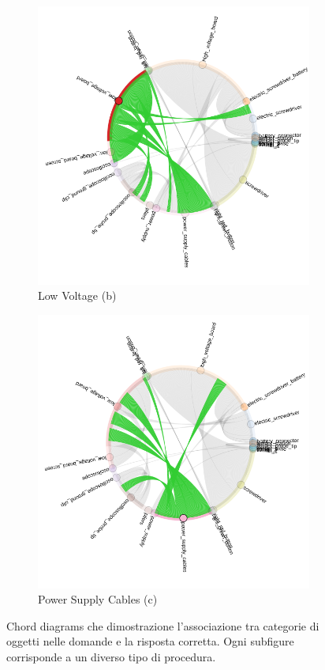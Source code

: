 \begin{figure}[ht]
\begin{subfigure}[b]{0.32\textwidth}
        \includegraphics[width=\linewidth]{Images/enigma_amb_low_voltage.png}
        \caption{Low Voltage (b)}
        \label{fig:low_voltage}
    \end{subfigure}
    \hfill
    \begin{subfigure}[b]{0.32\textwidth}
        \includegraphics[width=\linewidth]{Images/enigma_amb_power_supply.png}
        \caption{Power Supply Cables (c)}
        \label{fig:power_supply}
    \end{subfigure}
    \caption{Chord diagrams che dimostrazione l'associazione tra categorie di oggetti nelle domande e la risposta corretta. Ogni subfigure corrisponde a un diverso tipo di procedura.}
    \label{fig:enigma_chord}
\end{figure}

